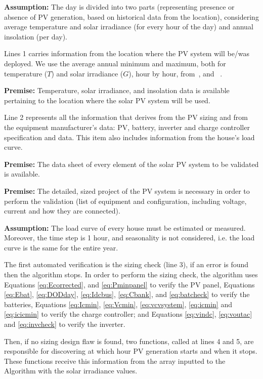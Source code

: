 \textbf{Assumption:} The day is divided into two parts (representing presence or absence of PV generation, based on historical data from the location), considering average temperature and solar irradiance (for every hour of the day) and  annual insolation (per day).

Lines 1 carries information from the location where the PV system will be/was deployed. We use the average annual minimum and maximum, both for temperature ($T$) and solar irradiance ($G$), hour by hour, from~\cite{Temperature}, and ~\cite{Irradiance}.

\textbf{Premise:} Temperature, solar irradiance, and insolation data is available pertaining to the location where the solar PV system will be used.

Line 2 represents all the information that derives from the PV sizing and from the equipment manufacturer's data: PV, battery, inverter and charge controller specification and data. This item also includes information from the house's load curve.

\textbf{Premise:} The data sheet of every element of the solar PV system to be validated is available.

\textbf{Premise:} The detailed, sized project of the PV system is necessary in order to perform the validation (list of equipment and configuration, including voltage, current and how they are connected).

\textbf{Assumption:} The load curve of every house must be estimated or measured. Moreover, the time step is 1 hour, and seasonality is not considered, i.e. the load curve is the same for the entire year.

The first automated verification is the sizing check (line 3), if an error is found then the algorithm stops. In order to perform the sizing check, the algorithm uses Equations \eqref{eq:Ecorrected}, and \eqref{eq:Pminpanel} to verify the PV panel, Equations \eqref{eq:Ebat}, \eqref{eq:DODday}, \eqref{eq:Idcbus}, \eqref{eq:Cbank}, and \eqref{eq:batcheck} to verify the batteries, Equations \eqref{eq:Icmin}, \eqref{eq:Vcmin}, \eqref{eq:vcvsystem}, \eqref{eq:icmin} and \eqref{eq:icicmin} to verify the charge controller; and Equations \eqref{eq:vindc}, \eqref{eq:voutac} and \eqref{eq:invcheck} to verify the inverter.

Then, if no sizing design flaw is found, two functions, called at lines 4 and 5, are responsible for discovering at which hour PV generation starts and when it stops. These functions receive this information from the array inputted to the Algorithm with the solar irradiance values.


